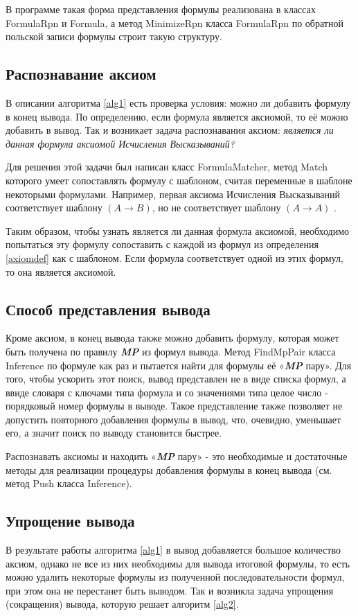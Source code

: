 \documentclass[a4paper,12pt]{article}
\theoremstyle{definition}
\begin{document}
	В программе такая форма представления формулы реализована в классах FormulaRpn и Formula, а метод MinimizeRpn класса FormulaRpn по обратной польской записи формулы строит такую структуру.
	
	\subsection{Распознавание аксиом}
	 В описании алгоритма \ref{alg1} есть проверка условия: можно ли добавить формулу в конец вывода. По определению, если формула является аксиомой, то её можно добавить в вывод. Так и возникает задача распознавания аксиом: \textit{является ли данная формула аксиомой Исчисления Высказываний?}
	 
	 Для решения этой задачи был написан класс FormulaMatcher, метод Match которого умеет сопоставлять формулу с шаблоном, считая переменные в шаблоне некоторыми формулами. Например, первая аксиома Исчисления Высказываний соответствует шаблону $ \left( A \to B \right)  $, но не соответствует шаблону $ \left( A \to A \right)  $ .
	 
	 Таким образом, чтобы узнать является ли данная формула аксиомой, необходимо попытаться эту формулу сопоставить с каждой из формул из определения \ref{axiomdef} как с шаблоном. Если формула соответствует одной из этих формул, то она является аксиомой.
	
	\subsection{Способ представления вывода}
	Кроме аксиом, в конец вывода также можно добавить формулу, которая может быть получена по правилу \textbf{\textit{MP}} из формул вывода. Метод FindMpPair класса Inference по формуле как раз и пытается найти для формулы её «\textbf{\textit{MP}} пару». Для того, чтобы ускорить этот поиск, вывод представлен не в виде списка формул, а ввиде словаря с ключами типа формула и со значениями типа целое число - порядковый номер формулы в выводе. Такое представление также позволяет не допустить повторного добавления формулы в вывод, что, очевидно, уменьшает его, а значит поиск по выводу становится быстрее.
	
	Распознавать аксиомы и находить «\textbf{\textit{MP}} пару» - это необходимые и достаточные методы для реализации процедуры добавления формулы в конец вывода (см. метод Push класса Inference).
	
	\subsection{Упрощение вывода}
	В результате работы алгоритма \ref{alg1} в вывод добавляется большое количество аксиом, однако не все из них необходимы для вывода итоговой формулы, то есть можно удалить некоторые формулы из полученной последовательности формул, при этом она не перестанет быть выводом. Так и возникла задача упрощения (сокращения) вывода, которую решает алгоритм \ref{alg2}.  
	
\end{document}
